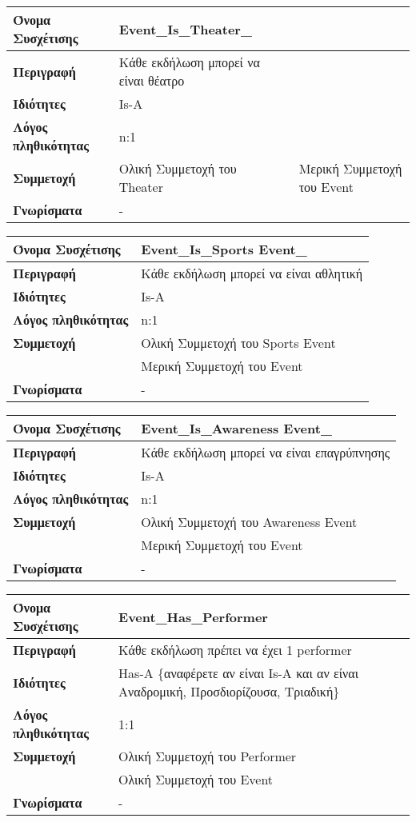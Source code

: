 \begin{tabular}[]{|p{4cm}|p{10cm}|}
  \hline
  \textbf{Όνομα Συσχέτισης} & Event\_Is\_Theater_\\ \hline
  \textbf{Περιγραφή} & Κάθε εκδήλωση μπορεί να είναι θέατρο\\ \hline
  \textbf{Ιδιότητες} & Is-A  \\ \hline
  \textbf{Λόγος πληθικότητας} & n:1 \\ \hline
 \textbf{Συμμετοχή} & Ολική Συμμετοχή του Theater\ 
                     & Μερική Συμμετοχή του Event \\ \hline
  \textbf{Γνωρίσματα} & - \\ \hline
\end{tabular}
\begin{tabular}[]{|p{4cm}|p{10cm}|}
  \hline
  \textbf{Όνομα Συσχέτισης} & Event\_Is\_Sports Event_\\ \hline
  \textbf{Περιγραφή} & Κάθε εκδήλωση μπορεί να είναι αθλητική\\ \hline
  \textbf{Ιδιότητες} & Is-A  \\ \hline
  \textbf{Λόγος πληθικότητας} & n:1 \\ \hline
 \textbf{Συμμετοχή} & Ολική Συμμετοχή του Sports Event\\ \cline{2-2}
                     & Μερική Συμμετοχή του Event \\ \hline
  \textbf{Γνωρίσματα} & - \\ \hline
\end{tabular}
\begin{tabular}[]{|p{4cm}|p{10cm}|}
  \hline
  \textbf{Όνομα Συσχέτισης} & Event\_Is\_Awareness Event_\\ \hline
  \textbf{Περιγραφή} & Κάθε εκδήλωση μπορεί να είναι επαγρύπνησης\\ \hline
  \textbf{Ιδιότητες} & Is-A  \\ \hline
  \textbf{Λόγος πληθικότητας} & n:1 \\ \hline
 \textbf{Συμμετοχή} & Ολική Συμμετοχή του Awareness Event\\ \cline{2-2}
                     & Μερική Συμμετοχή του Event \\ \hline
  \textbf{Γνωρίσματα} & - \\ \hline
\end{tabular}
\begin{tabular}[]{|p{4cm}|p{10cm}|}
  \hline
  \textbf{Όνομα Συσχέτισης} & Event\_Has\_Performer\\ \hline
  \textbf{Περιγραφή} & Κάθε εκδήλωση πρέπει να έχει 1 performer\\ \hline
  \textbf{Ιδιότητες} & Has-A \{αναφέρετε αν είναι Is-A και αν είναι
                       Αναδρομική, Προσδιορίζουσα, Τριαδική\} \\ \hline
  \textbf{Λόγος πληθικότητας} & 1:1 \\ \hline
  \textbf{Συμμετοχή} & Ολική Συμμετοχή του Performer \\ \cline{2-2}
                     & Ολική Συμμετοχή του Event\\ \hline
  \textbf{Γνωρίσματα} & - \\ \hline
\end{tabular}

